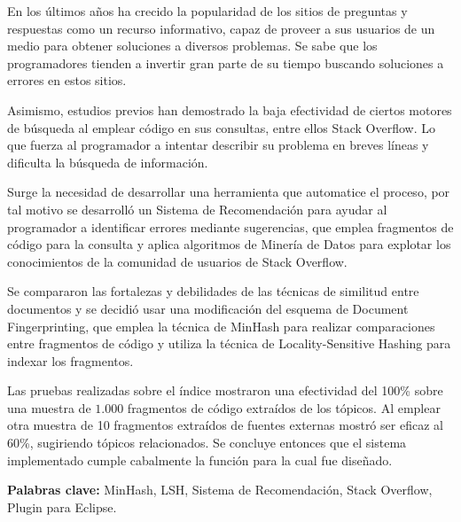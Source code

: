 \begin{resumen}
En los \'ultimos a\~nos ha crecido la popularidad de los sitios de preguntas y respuestas como un recurso informativo,
capaz de proveer a sus usuarios de un medio para obtener soluciones a diversos problemas.
Se sabe que los programadores tienden a invertir gran parte de su tiempo buscando soluciones a errores en estos sitios.

Asimismo, estudios previos han demostrado la baja efectividad de ciertos
motores de b\'usqueda al emplear c\'odigo en sus consultas, entre ellos Stack Overflow.
Lo que fuerza al programador a intentar describir su problema en breves l\'ineas
y dificulta la b\'usqueda de informaci\'on. 

Surge la necesidad de desarrollar una herramienta que automatice el proceso,
por tal motivo se desarroll\'o un Sistema de Recomendaci\'on para ayudar al programador a identificar errores mediante sugerencias,
que emplea fragmentos de c\'odigo para la consulta y 
aplica algoritmos de Miner\'ia de Datos para explotar los conocimientos de la comunidad de usuarios de Stack Overflow.

Se compararon las fortalezas y debilidades de las t\'ecnicas de similitud entre documentos
y se decidi\'o usar una modificaci\'on del esquema de Document Fingerprinting,
que emplea la t\'ecnica de MinHash para realizar comparaciones entre fragmentos de c\'odigo
y utiliza la t\'ecnica de Locality-Sensitive Hashing para indexar los fragmentos.

Las pruebas realizadas sobre el \'indice mostraron una efectividad del 100\%
sobre una muestra de $1.000$ fragmentos de c\'odigo extra\'idos de los t\'opicos.
Al emplear otra muestra de 10 fragmentos extra\'idos de fuentes externas mostr\'o ser eficaz al 60\%,
sugiriendo t\'opicos relacionados. Se concluye entonces que el sistema
implementado cumple cabalmente la funci\'on para la cual fue dise\~nado.

\vfill
\textbf{Palabras clave:} MinHash, LSH, Sistema de Recomendación, Stack Overflow, Plugin para Eclipse.
\end{resumen}